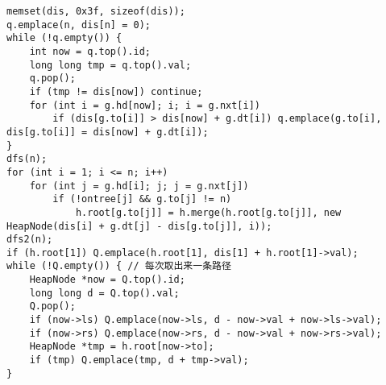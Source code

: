 \begin{verbatim}
memset(dis, 0x3f, sizeof(dis));
q.emplace(n, dis[n] = 0);
while (!q.empty()) {
    int now = q.top().id;
    long long tmp = q.top().val;
    q.pop();
    if (tmp != dis[now]) continue;
    for (int i = g.hd[now]; i; i = g.nxt[i])
        if (dis[g.to[i]] > dis[now] + g.dt[i]) q.emplace(g.to[i], dis[g.to[i]] = dis[now] + g.dt[i]);
}
dfs(n);
for (int i = 1; i <= n; i++)
    for (int j = g.hd[i]; j; j = g.nxt[j])
        if (!ontree[j] && g.to[j] != n)
            h.root[g.to[j]] = h.merge(h.root[g.to[j]], new HeapNode(dis[i] + g.dt[j] - dis[g.to[j]], i));
dfs2(n);
if (h.root[1]) Q.emplace(h.root[1], dis[1] + h.root[1]->val);
while (!Q.empty()) { // 每次取出来一条路径
    HeapNode *now = Q.top().id;
    long long d = Q.top().val;
    Q.pop();
    if (now->ls) Q.emplace(now->ls, d - now->val + now->ls->val);
    if (now->rs) Q.emplace(now->rs, d - now->val + now->rs->val);
    HeapNode *tmp = h.root[now->to];
    if (tmp) Q.emplace(tmp, d + tmp->val);
}
\end{verbatim}